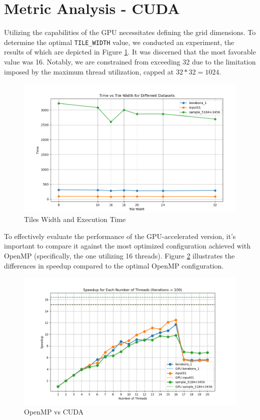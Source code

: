 \documentclass[sigconf]{acmart}
\begin{document}
\section{Metric Analysis - CUDA}
Utilizing the capabilities of the GPU necessitates defining the grid dimensions. To determine the optimal \texttt{TILE\_WIDTH} value, we conducted an experiment, the results of which are depicted in Figure \ref{fig2}. It was discerned that the most favorable value was 16. Notably, we are constrained from exceeding 32 due to the limitation imposed by the maximum thread utilization, capped at $32 * 32 = 1024$.

\begin{figure}[h]
  \centering
  \includegraphics[width=\linewidth]{images/tilesss.png}
  \caption{Tiles Width and Execution Time}
 \label{fig2}
\end{figure}
To effectively evaluate the performance of the GPU-accelerated version, it's important to compare it against the most optimized configuration achieved with OpenMP (specifically, the one utilizing 16 threads). Figure \ref{fig3} illustrates the differences in speedup compared to the optimal OpenMP configuration.

\begin{figure}[h]
  \centering
  \includegraphics[width=\linewidth]{images/openMPCUDA.png}
  \caption{OpenMP vs CUDA}
 \label{fig3}
\end{figure}
\end{document}
